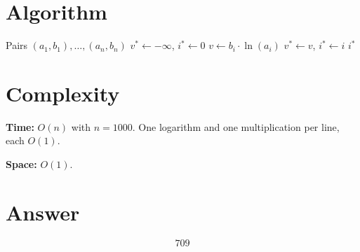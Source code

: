 \documentclass[12pt]{article}
\begin{document}
\section{Algorithm}

\begin{algorithm}[H]
\caption{Find line with largest exponential}
\begin{algorithmic}[1]
\REQUIRE Pairs $(a_1, b_1), \ldots, (a_n, b_n)$
\STATE $v^* \gets -\infty$, $i^* \gets 0$
    \STATE $v \gets b_i \cdot \ln(a_i)$
     \STATE $v^* \gets v$, $i^* \gets i$ \ENDIF
\ENDFOR
\RETURN $i^*$
\end{algorithmic}
\end{algorithm}

\section{Complexity}

\textbf{Time:} $O(n)$ with $n = 1000$. One logarithm and one multiplication per line, each $O(1)$.

\textbf{Space:} $O(1)$.

\section{Answer}

\[
\boxed{709}
\]
\end{document}
